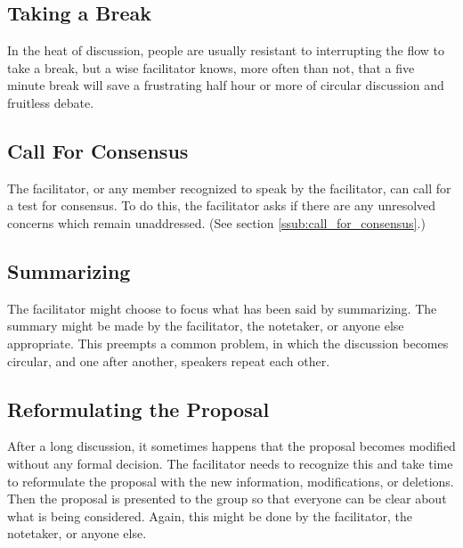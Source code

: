 \subsection{Taking a Break}

In the heat of discussion, people are usually resistant to
interrupting the flow to take a break, but a wise facilitator
knows, more often than not, that a five minute break will save a
frustrating half hour or more of circular discussion and fruitless
debate.

\subsection{Call For Consensus}

The facilitator, or any member recognized to speak by the
facilitator, can call for a test for consensus. To do this, the
facilitator asks if there are any unresolved concerns which remain
unaddressed. (See section \ref{ssub:call_for_consensus}.)

\subsection{Summarizing}

The facilitator might choose to focus what has been said by
summarizing.  The summary might be made by the facilitator, the
notetaker, or anyone else appropriate. This preempts a common
problem, in which the discussion becomes circular, and one after
another, speakers repeat each other.

\subsection{Reformulating the Proposal}

After a long discussion, it sometimes happens that the proposal
becomes modified without any formal decision. The facilitator needs
to recognize this and take time to reformulate the proposal with
the new information, modifications, or deletions. Then the proposal
is presented to the group so that everyone can be clear about what
is being considered. Again, this might be done by the facilitator,
the notetaker, or anyone else.

